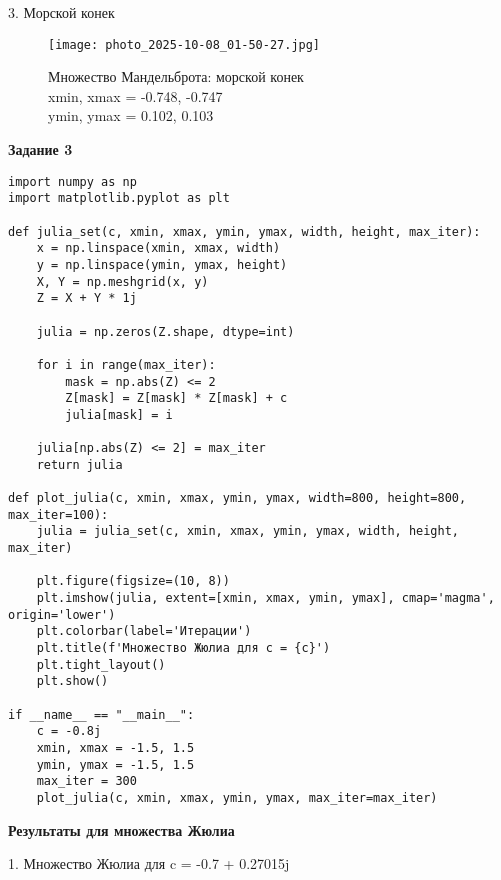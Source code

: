 \documentclass[a4paper,12pt]{article}
\begin{document}
\newpage

3. Морской конек

\begin{figure}[h!]
    \centering
    \texttt{[image: photo\_2025-10-08\_01-50-27.jpg]}
    \caption{Множество Мандельброта: морской конек \\ xmin, xmax = -0.748, -0.747 \\ ymin, ymax = 0.102, 0.103}
    \label{fig:mandel3}
\end{figure}

\newpage

\begin{center}
    \textbf{Задание 3}
\end{center}

\begin{verbatim}
import numpy as np
import matplotlib.pyplot as plt

def julia_set(c, xmin, xmax, ymin, ymax, width, height, max_iter):
    x = np.linspace(xmin, xmax, width)
    y = np.linspace(ymin, ymax, height)
    X, Y = np.meshgrid(x, y)
    Z = X + Y * 1j

    julia = np.zeros(Z.shape, dtype=int)

    for i in range(max_iter):
        mask = np.abs(Z) <= 2
        Z[mask] = Z[mask] * Z[mask] + c
        julia[mask] = i

    julia[np.abs(Z) <= 2] = max_iter
    return julia

def plot_julia(c, xmin, xmax, ymin, ymax, width=800, height=800, max_iter=100):
    julia = julia_set(c, xmin, xmax, ymin, ymax, width, height, max_iter)

    plt.figure(figsize=(10, 8))
    plt.imshow(julia, extent=[xmin, xmax, ymin, ymax], cmap='magma', origin='lower')
    plt.colorbar(label='Итерации')
    plt.title(f'Множество Жюлиа для c = {c}')
    plt.tight_layout()
    plt.show()

if __name__ == "__main__":
    c = -0.8j
    xmin, xmax = -1.5, 1.5
    ymin, ymax = -1.5, 1.5
    max_iter = 300
    plot_julia(c, xmin, xmax, ymin, ymax, max_iter=max_iter)
\end{verbatim}

\newpage

\begin{center}
    \textbf{Результаты для множества Жюлиа}
\end{center}

1. Множество Жюлиа для c = -0.7 + 0.27015j
\end{document}

